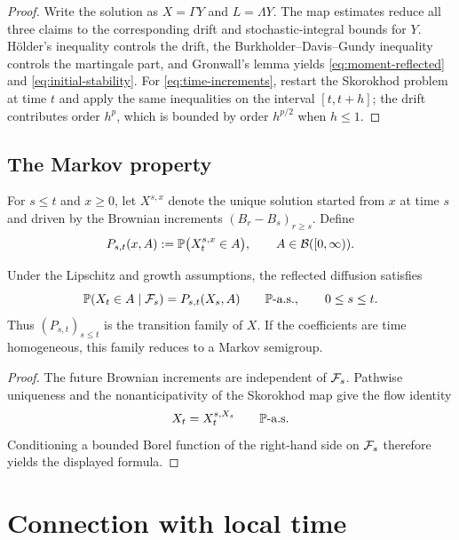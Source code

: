\begin{proof}
Write the solution as $X=\Gamma Y$ and $L=\Lambda Y$. The map estimates reduce
all three claims to the corresponding drift and stochastic-integral bounds
for $Y$. H\"older's inequality controls the drift, the
Burkholder--Davis--Gundy inequality controls the martingale part, and
Gronwall's lemma yields \eqref{eq:moment-reflected} and
\eqref{eq:initial-stability}. For \eqref{eq:time-increments}, restart the
Skorokhod problem at time $t$ and apply the same inequalities on the interval
$[t,t+h]$; the drift contributes order $h^p$, which is bounded by order
$h^{p/2}$ when $h\leq1$.
\end{proof}

\subsection{The Markov property}

For $s\leq t$ and $x\geq0$, let $X^{s,x}$ denote the unique solution started
from $x$ at time $s$ and driven by the Brownian increments
$(B_r-B_s)_{r\geq s}$. Define
\[
  P_{s,t}(x,A):=\P\bigl(X_t^{s,x}\in A\bigr),
  \qquad A\in\mathcal B([0,\infty)).
\]

\begin{theorem}
Under the Lipschitz and growth assumptions, the reflected diffusion satisfies
\[
  \P(X_t\in A\mid\cF_s)=P_{s,t}(X_s,A)
  \qquad\P\text{-a.s.},
  \qquad 0\leq s\leq t.
\]
Thus $(P_{s,t})_{s\leq t}$ is the transition family of $X$. If the
coefficients are time homogeneous, this family reduces to a Markov semigroup.
\end{theorem}

\begin{proof}
The future Brownian increments are independent of $\cF_s$. Pathwise
uniqueness and the nonanticipativity of the Skorokhod map give the flow
identity
\[
  X_t=X_t^{s,X_s}\qquad\P\text{-a.s.}
\]
Conditioning a bounded Borel function of the right-hand side on $\cF_s$
therefore yields the displayed formula.
\end{proof}

\section{Connection with local time}

